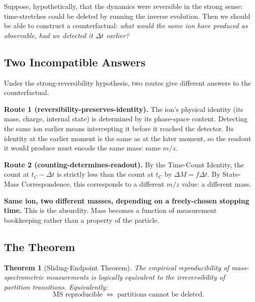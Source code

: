\documentclass[twocolumn,10pt,a4paper]{article}
\newtheorem{theorem}{Theorem}[section]
\theoremstyle{definition}
\theoremstyle{remark}
\newcommand{\Mcount}{M}
\begin{document}
Suppose, hypothetically, that the dynamics were reversible in the strong sense: time-stretches could be deleted by running the inverse evolution. Then we should be able to construct a counterfactual: \emph{what would the same ion have produced as observable, had we detected it $\Delta t$ earlier?}

\subsection{Two Incompatible Answers}

Under the strong-reversibility hypothesis, two routes give different answers to the counterfactual.

\textbf{Route 1 (reversibility-preserves-identity).} The ion's physical identity (its mass, charge, internal state) is determined by its phase-space content. Detecting the same ion earlier means intercepting it before it reached the detector. Its identity at the earlier moment is the same as at the later moment, so the readout it would produce must encode the same mass: same $m/z$.

\textbf{Route 2 (counting-determines-readout).} By the Time-Count Identity, the count at $t_C - \Delta t$ is strictly less than the count at $t_C$ by $\Delta \Mcount = f \Delta t$. By State-Mass Correspondence, this corresponds to a different $m/z$ value: a different mass.

\textbf{Same ion, two different masses, depending on a freely-chosen stopping time.} This is the absurdity. Mass becomes a function of measurement bookkeeping rather than a property of the particle.

\subsection{The Theorem}

\begin{theorem}[Sliding-Endpoint Theorem]
\label{thm:sliding}
The empirical reproducibility of mass-spectrometric measurements is logically equivalent to the irreversibility of partition transitions. Equivalently:
\begin{equation}
    \text{MS reproducible} \;\Longleftrightarrow\; \text{partitions cannot be deleted}.
\end{equation}
\end{theorem}
\end{document}
